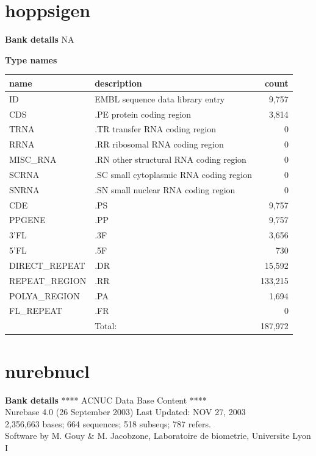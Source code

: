 \documentclass{article}
\begin{document}
\begin{Schunk}
\section{ hoppsigen }
\textbf{Bank details}
NA

\textbf{Type names}
\noindent\begin{tabular}{llr}
\hline \hline
name & description & count \\
\hline
ID  &  EMBL sequence data library entry  &  9,757 \\
CDS  &  .PE protein coding region  &  3,814 \\
TRNA  &  .TR transfer RNA coding region  &  0 \\
RRNA  &  .RR ribosomal RNA coding region  &  0 \\
MISC\_RNA  &  .RN other structural RNA coding region  &  0 \\
SCRNA  &  .SC small cytoplasmic RNA coding region  &  0 \\
SNRNA  &  .SN small nuclear RNA coding region  &  0 \\
CDE  &  .PS  &  9,757 \\
PPGENE  &  .PP  &  9,757 \\
3'FL  &  .3F  &  3,656 \\
5'FL  &  .5F  &  730 \\
DIRECT\_REPEAT  &  .DR  &  15,592 \\
REPEAT\_REGION  &  .RR  &  133,215 \\
POLYA\_REGION  &  .PA  &  1,694 \\
FL\_REPEAT  &  .FR  &  0 \\
\hline
 & Total: & 187,972 \\
\hline \hline
\end{tabular}

\section{ nurebnucl }
\textbf{Bank details}
             ****     ACNUC Data Base Content      ****                         \\
         Nurebase 4.0 (26 September 2003) Last Updated: NOV 27, 2003\\
2,356,663 bases; 664 sequences; 518 subseqs; 787 refers.\\
Software by M. Gouy \& M. Jacobzone, Laboratoire de biometrie, Universite Lyon I 


\end{Schunk}
\end{document}

